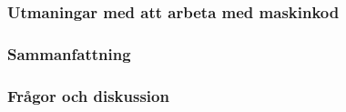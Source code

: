 \begin{frame}[fragile=singleslide]
    \frametitle{Utmaningar med att arbeta med maskinkod}
\end{frame}

\begin{frame}[fragile=singleslide]
    \frametitle{Sammanfattning}
\end{frame}

\begin{frame}[fragile=singleslide]
    \frametitle{Frågor och diskussion}
\end{frame}